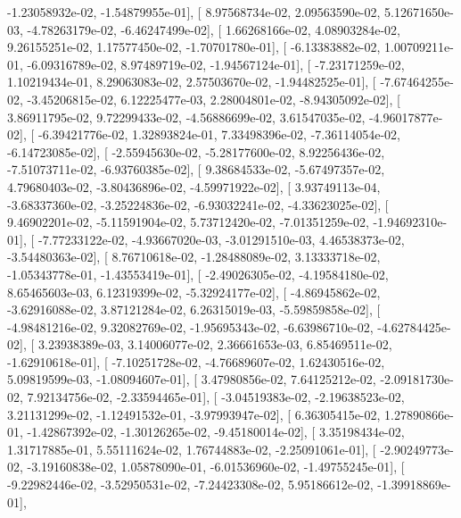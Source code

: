 \documentclass{article}
\begin{document}
         -1.23058932e-02,  -1.54879955e-01],
       [  8.97568734e-02,   2.09563590e-02,   5.12671650e-03,
         -4.78263179e-02,  -6.46247499e-02],
       [  1.66268166e-02,   4.08903284e-02,   9.26155251e-02,
          1.17577450e-02,  -1.70701780e-01],
       [ -6.13383882e-02,   1.00709211e-01,  -6.09316789e-02,
          8.97489719e-02,  -1.94567124e-01],
       [ -7.23171259e-02,   1.10219434e-01,   8.29063083e-02,
          2.57503670e-02,  -1.94482525e-01],
       [ -7.67464255e-02,  -3.45206815e-02,   6.12225477e-03,
          2.28004801e-02,  -8.94305092e-02],
       [  3.86911795e-02,   9.72299433e-02,  -4.56886699e-02,
          3.61547035e-02,  -4.96017877e-02],
       [ -6.39421776e-02,   1.32893824e-01,   7.33498396e-02,
         -7.36114054e-02,  -6.14723085e-02],
       [ -2.55945630e-02,  -5.28177600e-02,   8.92256436e-02,
         -7.51073711e-02,  -6.93760385e-02],
       [  9.38684533e-02,  -5.67497357e-02,   4.79680403e-02,
         -3.80436896e-02,  -4.59971922e-02],
       [  3.93749113e-04,  -3.68337360e-02,  -3.25224836e-02,
         -6.93032241e-02,  -4.33623025e-02],
       [  9.46902201e-02,  -5.11591904e-02,   5.73712420e-02,
         -7.01351259e-02,  -1.94692310e-01],
       [ -7.77233122e-02,  -4.93667020e-03,  -3.01291510e-03,
          4.46538373e-02,  -3.54480363e-02],
       [  8.76710618e-02,  -1.28488089e-02,   3.13333718e-02,
         -1.05343778e-01,  -1.43553419e-01],
       [ -2.49026305e-02,  -4.19584180e-02,   8.65465603e-03,
          6.12319399e-02,  -5.32924177e-02],
       [ -4.86945862e-02,  -3.62916088e-02,   3.87121284e-02,
          6.26315019e-03,  -5.59859858e-02],
       [ -4.98481216e-02,   9.32082769e-02,  -1.95695343e-02,
         -6.63986710e-02,  -4.62784425e-02],
       [  3.23938389e-03,   3.14006077e-02,   2.36661653e-03,
          6.85469511e-02,  -1.62910618e-01],
       [ -7.10251728e-02,  -4.76689607e-02,   1.62430516e-02,
          5.09819599e-03,  -1.08094607e-01],
       [  3.47980856e-02,   7.64125212e-02,  -2.09181730e-02,
          7.92134756e-02,  -2.33594465e-01],
       [ -3.04519383e-02,  -2.19638523e-02,   3.21131299e-02,
         -1.12491532e-01,  -3.97993947e-02],
       [  6.36305415e-02,   1.27890866e-01,  -1.42867392e-02,
         -1.30126265e-02,  -9.45180014e-02],
       [  3.35198434e-02,   1.31717885e-01,   5.55111624e-02,
          1.76744883e-02,  -2.25091061e-01],
       [ -2.90249773e-02,  -3.19160838e-02,   1.05878090e-01,
         -6.01536960e-02,  -1.49755245e-01],
       [ -9.22982446e-02,  -3.52950531e-02,  -7.24423308e-02,
          5.95186612e-02,  -1.39918869e-01],
\end{document}
